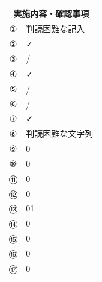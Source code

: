 \documentclass[UTF8,10pt,a4paper,fontset=fandol]{ctexart}
\newcommand{\fieldvalue}[1]{#1}
\newcommand{\handwritten}[1]{#1}
\begin{document}
\noindent
\begin{tabularx}{\textwidth}{|c|X|}
\hline
\multicolumn{2}{|c|}{実施内容・確認事項} \\
\hline
① &
\fieldvalue{\handwritten{判読困難な記入}} \\
\hline
② &
\fieldvalue{\handwritten{✓}} \\
\hline
③ &
\fieldvalue{\handwritten{/}} \\
\hline
④ &
\fieldvalue{\handwritten{✓}} \\
\hline
⑤ &
\fieldvalue{\handwritten{/}} \\
\hline
⑥ &
\fieldvalue{\handwritten{/}} \\
\hline
⑦ &
\fieldvalue{\handwritten{✓}} \\
\hline
⑧ &
\fieldvalue{\handwritten{判読困難な文字列}} \\
\hline
⑨ &
\fieldvalue{\handwritten{0}} \\
\hline
⑩ &
\fieldvalue{\handwritten{0}} \\
\hline
⑪ &
\fieldvalue{\handwritten{0}} \\
\hline
⑫ &
\fieldvalue{\handwritten{0}} \\
\hline
⑬ &
\fieldvalue{\handwritten{01}} \\
\hline
⑭ &
\fieldvalue{\handwritten{0}} \\
\hline
⑮ &
\fieldvalue{\handwritten{0}} \\
\hline
⑯ &
\fieldvalue{\handwritten{0}} \\
\hline
⑰ &
\fieldvalue{\handwritten{0}} \\
\hline
\end{tabularx}
\end{document}

